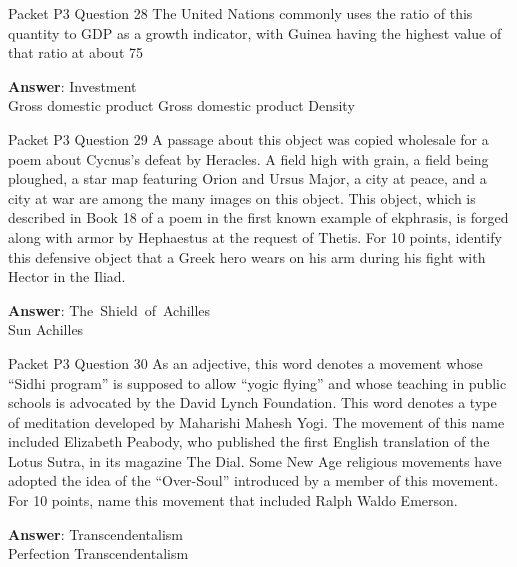 \begin{frame}{Packet P3 Question 28}
The United Nations commonly uses the ratio of this quantity to GDP as a growth indicator, with Guinea   having the highest value of that ratio at about 75%

\textbf{Answer}: Investment\\
 Gross domestic product
 Gross domestic product
 Density
\end{frame}

\begin{frame}{Packet P3 Question 29}
A passage about this object was copied wholesale for a poem about Cycnus’s defeat by Heracles. A field high with grain, a field being ploughed, a star map featuring Orion and Ursus Major, a city at peace, and a city at war are among the many images on this object. This object, which   is described in Book 18 of a poem in the first known example of ekphrasis, is     forged along with armor by Hephaestus at the request of Thetis. For 10 points, identify this defensive object that a Greek hero wears on his arm during his fight with Hector in the Iliad.  

\textbf{Answer}: The\ Shield\ of\ Achilles\\
 Sun
 Achilles
\end{frame}

\begin{frame}{Packet P3 Question 30}
As an adjective, this   word denotes a movement whose “Sidhi program” is supposed to allow “yogic flying” and whose teaching in public schools is advocated by the David Lynch Foundation. This word denotes a type of meditation developed by Maharishi Mahesh Yogi. The movement of this name included Elizabeth Peabody, who published     the first English translation of the Lotus Sutra, in its magazine The Dial. Some New Age religious movements have adopted the idea of the “Over-Soul” introduced by a member of this movement. For 10 points, name this movement that included   Ralph Waldo Emerson.  

\textbf{Answer}: Transcendentalism\\
 Perfection
 Transcendentalism
\end{frame}

